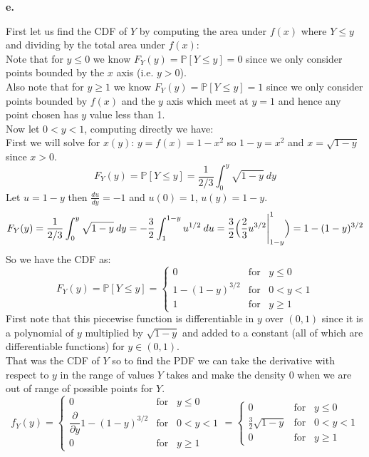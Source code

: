 \documentclass{article}
\begin{document}
\newpage
{\Large\textbf{e.}}
\begin{center}
\doublespacing
    First let us find the CDF of $Y$ by computing the area under $f(x)$ where $Y\leq y$ and dividing by the total area under $f(x)$:
    \\Note that for $y\leq 0$ we know $F_Y (y) =\mathbb{P}[Y\leq y] = 0$ since we only consider points bounded by the $x$ axis (i.e. $y > 0$).
    \\Also note that for $y\geq 1$ we know $F_Y (y) =\mathbb{P}[Y\leq y] = 1$ since we only consider points bounded by $f(x)$ and the $y$ axis which meet at $y = 1$ and hence any point chosen has $y$ value less than 1.
    \\Now let $0 < y < 1$, computing directly we have:
    \\First we will solve for $x(y)$: $y = f(x) = 1 - x^2$ so $1 - y = x^2$ and $x =\sqrt{1 - y}$ since $x > 0$.
    \[F_Y (y) =\mathbb{P}[Y\leq y] =\frac{1}{2/3}\int_0^y\sqrt{1-y}\: dy\]
    Let $u = 1 - y$ then $\frac{du}{dy} = -1$ and $u(0) = 1$, $u(y) = 1 - y$.
    \[F_Y (y) =\frac{1}{2/3}\int_0^y\sqrt{1 - y}\: dy = -\frac{3}{2}\int_1^{1-y} u^{1/2}\: du =\frac{3}{2}\Big{(}\frac{2}{3}u^{3/2}\Bigg{|}_{1-y}^1\Big{)} = 1 - (1 - y)^{3/2}\]
    So we have the CDF as:
    \[F_Y (y) =\mathbb{P}[Y\leq y] =
    \begin{cases}
        0 & \mbox{for}\;\;\;y\leq 0 \\
        1 - (1 - y)^{3/2} & \mbox{for}\;\;\;0 < y < 1 \\
        1 & \mbox{for}\;\;\;y\geq 1
    \end{cases}
    \]
    First note that this piecewise function is differentiable in $y$ over $(0, 1)$ since it is a polynomial of $y$ multiplied by $\sqrt{1-y}$ and added to a constant (all of which are differentiable functions) for $y\in (0,1)$.
    \\That was the CDF of $Y$ so to find the PDF we can take the derivative with respect to $y$ in the range of values $Y$ takes and make the density 0 when we are out of range of possible points for $Y$.
    \[f_{Y}(y) =
    \begin{cases}
        0 & \mbox{for}\;\;\; y\leq 0 \\
        \dfrac{\partial}{\partial y} 1 - (1 - y)^{3/2} & \mbox{for}\;\;\; 0 < y < 1 \\
        0 & \mbox{for}\;\;\; y\geq 1
    \end{cases}
    =
    \begin{cases}
        0 & \mbox{for}\;\;\; y\leq 0 \\
        \frac{3}{2}\sqrt{1-y} & \mbox{for}\;\;\; 0 < y < 1 \\
        0 & \mbox{for}\;\;\; y\geq 1
    \end{cases}
    \]
\end{center}
\end{document}
